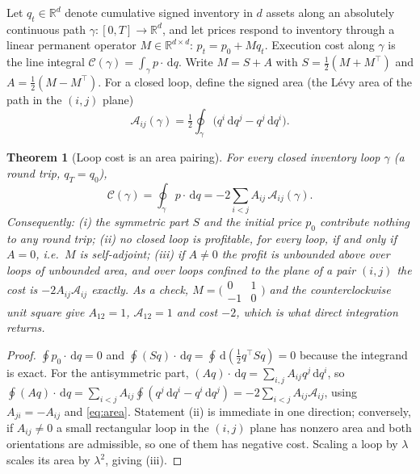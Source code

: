 \documentclass[11pt]{article}
\numberwithin{equation}{section}
\newtheorem{theorem}{Theorem}[section]
\theoremstyle{definition}
\theoremstyle{remark}
\newcommand{\R}{\mathbb{R}}
\theoremstyle{definition}
\newcommand{\dd}{\,\mathrm d}
\begin{document}
Let $q_t\in\R^d$ denote cumulative signed inventory in $d$ assets along an
absolutely continuous path $\gamma:[0,T]\to\R^d$, and let prices respond to
inventory through a linear permanent operator $M\in\R^{d\times d}$:
$p_t=p_0+Mq_t$. Execution cost along $\gamma$ is the line integral
$\mathcal C(\gamma)=\int_\gamma p\cdot\dd q$. Write $M=S+A$ with
$S=\tfrac12(M+M^\top)$ and $A=\tfrac12(M-M^\top)$. For a closed loop, define the
signed area (the L\'evy area of the path in the $(i,j)$ plane)
\begin{equation}\label{eq:area}
 \mathcal A_{ij}(\gamma)=\tfrac12\oint_\gamma\bigl(q^i\dd q^j-q^j\dd q^i\bigr).
\end{equation}

\begin{theorem}[Loop cost is an area pairing]\label{thm:stokes}
For every closed inventory loop $\gamma$ (a round trip, $q_T=q_0$),
\begin{equation}\label{eq:loopcost}
 \mathcal C(\gamma)=\oint_\gamma p\cdot\dd q
 =-2\sum_{i<j}A_{ij}\,\mathcal A_{ij}(\gamma).
\end{equation}
Consequently: (i) the symmetric part $S$ and the initial price $p_0$ contribute
nothing to any round trip; (ii) no closed loop is profitable, for every loop, if
and only if $A=0$, i.e.\ $M$ is self-adjoint; (iii) if $A\ne0$ the profit is
unbounded above over loops of unbounded area, and over loops confined to the
plane of a pair $(i,j)$ the cost is $-2A_{ij}\mathcal A_{ij}$ exactly. As a
check, $M=\bigl(\begin{smallmatrix}0&1\\-1&0\end{smallmatrix}\bigr)$ and the
counterclockwise unit square give $A_{12}=1$, $\mathcal A_{12}=1$ and cost
$-2$, which is what direct integration returns.
\end{theorem}
\begin{proof}
$\oint p_0\cdot\dd q=0$ and $\oint (Sq)\cdot\dd q=\oint\dd(\tfrac12q^\top Sq)=0$
because the integrand is exact. For the antisymmetric part,
$(Aq)\cdot\dd q=\sum_{i,j}A_{ij}q^j\dd q^i$, so
$\oint(Aq)\cdot\dd q=\sum_{i<j}A_{ij}\oint(q^j\dd q^i-q^i\dd q^j)
=-2\sum_{i<j}A_{ij}\mathcal A_{ij}$, using $A_{ji}=-A_{ij}$ and
\eqref{eq:area}. Statement (ii) is immediate in one direction; conversely, if
$A_{ij}\ne0$ a small rectangular loop in the $(i,j)$ plane has nonzero area and
both orientations are admissible, so one of them has negative cost. Scaling a
loop by $\lambda$ scales its area by $\lambda^2$, giving (iii).
\end{proof}
\end{document}
